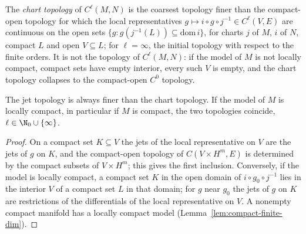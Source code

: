 \begin{definition}
  \label{def:chart-topology}
  \leanok
  The \emph{chart topology} of $C^\ell(M, N)$ is the coarsest topology finer than the
  compact-open topology for which the local representatives
  $g \mapsto i \circ g \circ j^{-1} \in C^\ell(V, E)$ are continuous on the open sets
  $\{g : g(j^{-1}(L)) \subseteq \mathrm{dom}\, i\}$, for charts $j$ of $M$, $i$ of $N$, compact
  $L$ and open $V \subseteq L$; for $\ell = \infty$, the initial topology with respect to the finite
  orders. It is not the topology of $C^\ell(M, N)$: if the model of $M$ is not locally compact,
  compact sets have empty interior, every such $V$ is empty, and the chart topology collapses to
  the compact-open $C^0$ topology.
\end{definition}

\begin{proposition}
  \label{prop:chart-jet}
  \leanok
  The jet topology is always finer than the chart topology. If the model of $M$ is locally
  compact, in particular if $M$ is compact, the two topologies coincide,
  $\ell \in \N_0 \cup \{\infty\}$.
\end{proposition}

\begin{proof}
  \leanok
  On a compact set $K \subseteq V$ the jets of the local representative on $V$ are the jets of $g$
  on $K$, and the compact-open topology of $C(V \times H^m, E)$ is determined by the compact
  subsets of $V \times H^m$; this gives the first inclusion. Conversely, if the model is locally
  compact, a compact set $K$ in the open domain of $i \circ g_0 \circ j^{-1}$ lies in the interior
  $V$ of a compact set $L$ in that domain; for $g$ near $g_0$ the jets of $g$ on $K$ are
  restrictions of the differentials of the local representative on $V$. A nonempty compact
  manifold has a locally compact model (Lemma~\ref{lem:compact-finite-dim}).
\end{proof}

